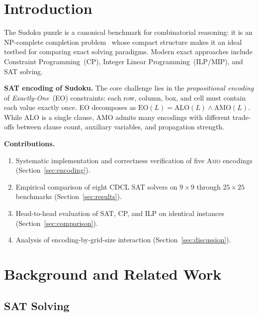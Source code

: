 \documentclass[preprint,10pt,authoryear]{elsarticle}
\newcommand{\AMO}{\textsc{Amo}}
\begin{document}
\section{Introduction}
\label{sec:intro}

The Sudoku puzzle is a canonical benchmark for combinatorial reasoning: it is
an NP-complete completion problem~\citep{Yato2003} whose compact structure
makes it an ideal testbed for comparing exact solving paradigms.
Modern exact approaches include Constraint Programming~(CP), Integer Linear
Programming~(ILP/MIP), and SAT solving.

\medskip
\noindent\textbf{SAT encoding of Sudoku.}
The core challenge lies in the \emph{propositional encoding} of
\emph{Exactly-One}~(EO) constraints: each row, column, box, and cell must
contain each value exactly once.
EO decomposes as $\text{EO}(L) = \text{ALO}(L) \wedge \text{AMO}(L)$.
While ALO is a single clause, AMO admits many encodings with different
trade-offs between clause count, auxiliary variables, and propagation strength.

\medskip
\noindent\textbf{Contributions.}
\begin{enumerate}
  \item Systematic implementation and correctness verification of five \AMO{}
        encodings (Section~\ref{sec:encoding}).
  \item Empirical comparison of eight CDCL SAT solvers on $9\!\times\!9$
        through $25\!\times\!25$ benchmarks (Section~\ref{sec:results}).
  \item Head-to-head evaluation of SAT, CP, and ILP on identical instances
        (Section~\ref{sec:comparison}).
  \item Analysis of encoding-by-grid-size interaction
        (Section~\ref{sec:discussion}).
\end{enumerate}

\section{Background and Related Work}
\label{sec:background}

\subsection{SAT Solving}
\end{document}
